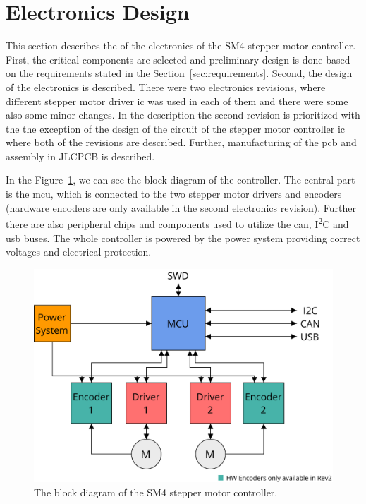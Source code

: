 \section{Electronics Design}
\label{sec:hardware}

This section describes the of the electronics of the SM4 stepper motor controller.
First, the critical components are selected and preliminary design is done based on the requirements stated in the Section~\ref{sec:requirements}.
Second, the design of the electronics is described.
There were two electronics revisions, where different stepper motor driver \acs{ic} was used in each of them and there were some also some minor changes.
In the description the second revision is prioritized with the the exception of the design of the circuit of the stepper motor controller \acs{ic} where both of the revisions are described.
Further, manufacturing of the \acs{pcb} and assembly in JLCPCB is described.

In the Figure~\ref{fig:sm4diagram}, we can see the block diagram of the controller.
The central part is the \acs{mcu}, which is connected to the two stepper motor drivers and encoders (hardware encoders are only available in the second electronics revision).
Further there are also peripheral chips and components used to utilize the \acs{can}, I\textsuperscript{2}C and \acs{usb} buses.
The whole controller is powered by the power system providing correct voltages and electrical protection.

\begin{figure}[H]
    \centering
    \includegraphics[width=\textwidth]{obrazky/sm4_block_diagram}
    \caption{The block diagram of the SM4 stepper motor controller.}
    \label{fig:sm4diagram}
\end{figure}


